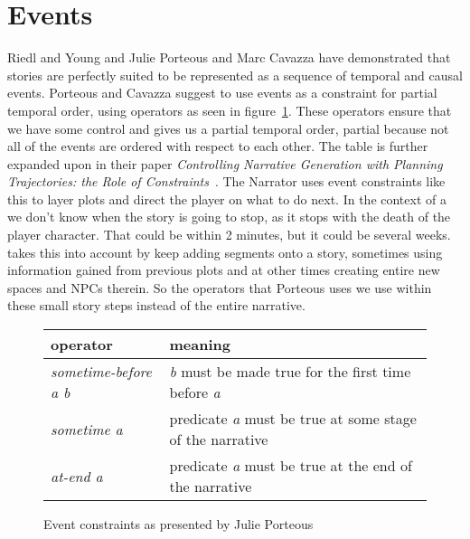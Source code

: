 \section{Events}
Riedl and Young\cite{Riedl:2004:IPM:1018409.1018753} and Julie Porteous and Marc Cavazza\cite{Porteous:2009:CNG:1695522.1695557} have demonstrated that stories are perfectly suited to be represented as a sequence of temporal and causal events.
Porteous and Cavazza suggest to use events as a constraint for partial temporal order, using operators as seen in figure~\ref{fig:events}.
These operators ensure that we have some control and gives us a partial temporal order, partial because not all of the events are ordered with respect to each other.
The table is further expanded upon in their paper \textit{Controlling Narrative Generation with Planning Trajectories: the Role of Constraints}~\cite{Porteous:2009:CNG:1695522.1695557}. The Narrator uses event constraints like this to layer plots and direct the player on what to do next.
In the context of a \rogue we don't know when the story is going to stop, as it stops with the death of the player character.
That could be within 2 minutes, but it could be several weeks.
\diage takes this into account by keep adding segments onto a story, sometimes using information gained from previous plots and at other times creating entire new spaces and NPCs therein.
So the operators that Porteous uses we use within these small story steps instead of the entire narrative.

\begin{figure}[!h]
\begin{tabular}{|l||l|}
\hline 
operator & meaning \\ 
\hline
\hline 
\textit{sometime-before a b} & \textit{b} must be made true for the first time before \textit{a} \\ 
\hline 
\textit{sometime a} & predicate \textit{a} must be true at some stage of the narrative \\ 
\hline 
\textit{at-end a} & predicate \textit{a} must be true at the end of the narrative \\ 
\hline 
\end{tabular} 
\caption{Event constraints as presented by Julie Porteous}\label{fig:events}
\end{figure}

